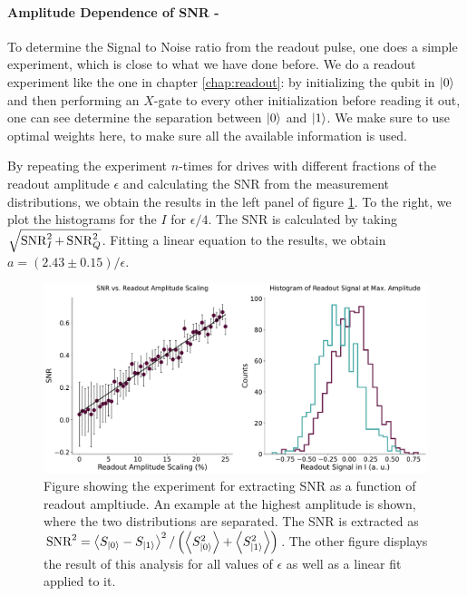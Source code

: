 \paragraph{Amplitude Dependence of SNR - }
To determine the Signal to Noise ratio from the readout pulse, one does a simple experiment, which is close to what we have done before. We do a readout experiment like the one in chapter \ref{chap:readout}: by initializing the qubit in $\ket{0}$ and then performing an $X$-gate to every other initialization before reading it out, one can see determine the separation between $\ket{0}$ and $\ket{1}$. We make sure to use optimal weights here, to make sure all the available information is used.


By repeating the experiment $n$-times for drives with different fractions of the readout amplitude $\epsilon$ and calculating the SNR from the measurement distributions, we obtain the results in the left panel of figure \ref{fig:effiiency_results_SNR}. To the right, we plot the histograms for the $I$ for $\epsilon / 4$. The SNR is calculated by taking $\sqrt{\operatorname{SNR}_I^2 + \operatorname{SNR}_Q^2}$. Fitting a linear equation to the results, we obtain $a = (2.43 \pm 0.15) / \epsilon$. 

\begin{figure}
    \raggedleft
    \includegraphics[width = 1.0 \linewidth]{Calibrations/Figures/SNR_vs_amplitude.pdf}
    \caption{Figure showing the experiment for extracting SNR as a function of readout ampltiude. An example at the highest amplitude is shown, where the two distributions are separated. The SNR is extracted as $\text{SNR}^2 = \expval{S_{\ket{0}} - S_{\ket{1}}}^2/\left(\expval{S^2_{\ket{0}}} +\expval{S^2_{\ket{1}}}\right)$. The other figure displays the result of this analysis for all values of $\epsilon$ as well as a linear fit applied to it.}
    \label{fig:effiiency_results_SNR}
\end{figure}



